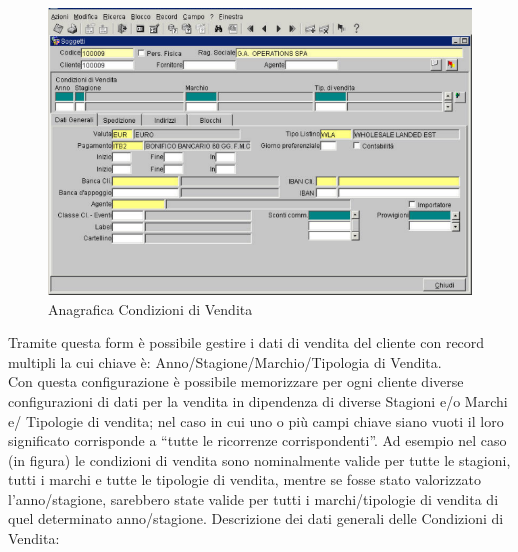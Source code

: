 \begin{figure}[!h]
\thispagestyle{empty}
\centering
\includegraphics[scale=0.90]{img/CondVen.png}
\caption{Anagrafica Condizioni di Vendita}
\end{figure}

Tramite questa form è possibile gestire i dati di vendita del cliente con record multipli la cui chiave è: Anno/Stagione/Marchio/Tipologia di Vendita.\\
Con questa configurazione è possibile memorizzare per ogni cliente diverse configurazioni di dati per la vendita in dipendenza di diverse Stagioni e/o Marchi e/ Tipologie di vendita; nel caso in cui uno o più campi chiave siano vuoti il loro significato corrisponde a “tutte le ricorrenze corrispondenti”. Ad esempio nel caso (in figura) le condizioni di vendita sono nominalmente valide per tutte le stagioni, tutti i marchi e tutte le tipologie di vendita, mentre se fosse stato valorizzato l'anno/stagione, sarebbero state valide per tutti i marchi/tipologie di vendita di quel determinato anno/stagione.
\newpage
Descrizione dei dati generali delle Condizioni di Vendita:

